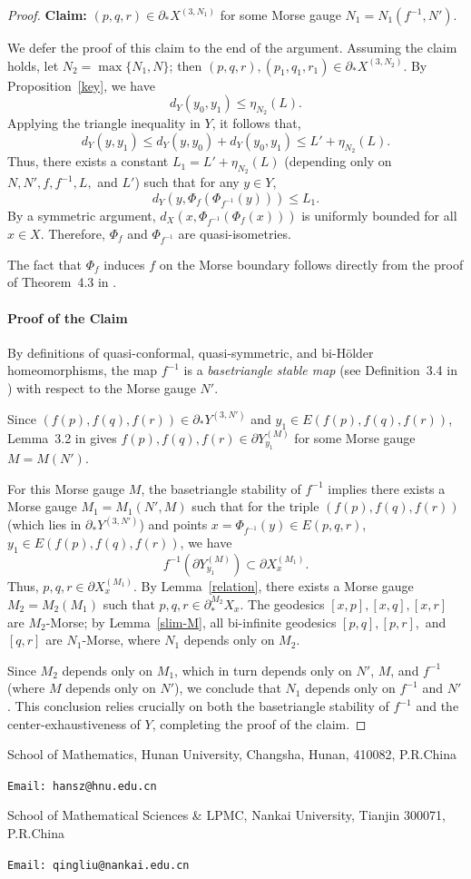 \documentclass[a4paper,11pt,oneside]{article}
\begin{document}
\begin{proof}
 \textbf{Claim:} $(p, q, r)\in \partial_*X^{(3,N_1)}$ for some Morse gauge $N_1=N_1(f^{-1}, N')$.
 
 We defer the proof of this claim to the end of the argument. Assuming the claim holds, let $N_2=\max\{N_1, N\}$; then $(p, q, r), (p_1, q_1,r_1)\in \partial_*X^{(3, N_2)}$. By Proposition~\ref{key}, we have 
 \[
 d_Y(y_0, y_1)\le\eta_{N_2}(L).
 \]
 Applying the triangle inequality in $Y$, it follows that,
 \[
 d_Y(y, y_1)\le d_Y(y, y_0)+d_Y(y_0, y_1)\le L'+\eta_{N_2}(L).
 \]
Thus, there exists a constant $L_1=L'+\eta_{N_2}(L)$ (depending only on  $N, N', f, f^{-1}, L,$ and $L'$) such that for any $y\in Y$,  
\[
d_Y(y, \Phi_f(\Phi_{f^{-1}}(y)))\le L_1.
\]
By a symmetric argument, $d_X(x, \Phi_{f^{-1}}(\Phi_{f}(x)))$ is uniformly bounded for all $x\in X$. Therefore, $\Phi_f$ and $\Phi_{f^{-1}}$ are quasi-isometries. 

The fact that $\Phi_f$ induces $f$ on the Morse boundary follows directly from the proof of Theorem~4.3 in \cite{Liu22}.

\medskip
\paragraph{Proof of the Claim} 
By definitions of quasi-conformal, quasi-symmetric, and bi-H\"older homeomorphisms, the map $f^{-1}$ is a \textit{basetriangle stable map} (see Definition~3.4 in \cite{Liu22}) with respect to the Morse gauge $N'$. 

Since $(f(p), f(q), f(r))\in \partial_*Y^{(3, N')}$ and $y_1\in E(f(p), f(q), f(r))$, Lemma~3.2 in \cite{Liu22} gives $f(p), f(q), f(r)\in \partial Y_{y_1}^{(M)}$ for some Morse gauge $M=M(N')$.

For this Morse gauge $M$, the basetriangle stability of $f^{-1}$ implies there exists a Morse gauge $M_1=M_1(N', M)$ such that for the triple $(f(p), f(q), f(r))$ (which lies in $\partial_*Y^{(3, N')}$) and points $x=\Phi_{f^{-1}}(y)\in E(p, q, r)$, $y_1\in E(f(p), f(q), f(r))$, we have 
\[
f^{-1}(\partial Y_{y_1}^{(M)})\subset \partial X_{x}^{(M_1)}.
\]
Thus, $p, q, r\in \partial X_x^{(M_1)}$. By Lemma~\ref{relation}, there exists a Morse gauge $M_2=M_2(M_1)$ such that $p, q, r\in \partial_*^{M_2}X_x$. 
The geodesics $[x, p],[x, q],[x, r]$ are $M_2$-Morse; by Lemma~\ref{slim-M}, all bi-infinite geodesics $[p, q], [p,r],$ and $[q, r]$ are $N_1$-Morse, where $N_1$ depends only on $M_2$. 

Since $M_2$ depends only on $M_1$, which in turn depends only on $N'$, $M$, and $f^{-1}$ (where $M$ depends only on $N'$), we conclude that $N_1$ depends only on $f^{-1}$ and $N'$. This conclusion relies crucially on both the basetriangle stability of $f^{-1}$ and the center-exhaustiveness of $Y$, completing the proof of the claim.

    
\end{proof}






\bigskip
{School of Mathematics, Hunan University, Changsha, Hunan, 410082, P.R.China}

{\tt Email: hansz@hnu.edu.cn}

\bigskip
{School of Mathematical Sciences \& LPMC, Nankai University, Tianjin 300071, P.R.China}

{\tt Email: qingliu@nankai.edu.cn}
\end{document}
